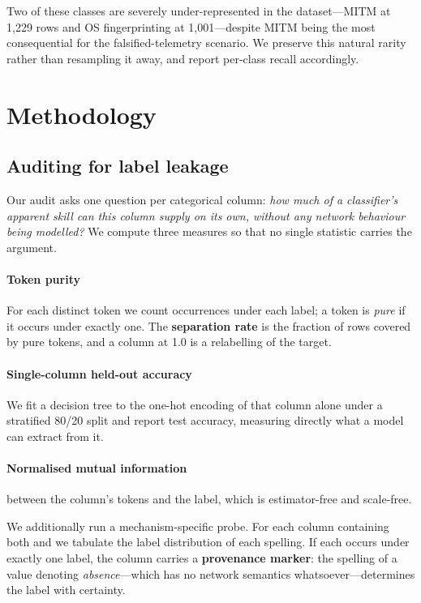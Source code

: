 Two of these classes are severely under-represented in the dataset---MITM at
1{,}229 rows and OS fingerprinting at 1{,}001---despite MITM being the most
consequential for the falsified-telemetry scenario. We preserve this natural
rarity rather than resampling it away, and report per-class recall accordingly.

\section{Methodology}

\subsection{Auditing for label leakage}
\label{sec:method-audit}

Our audit asks one question per categorical column: \emph{how much of a
classifier's apparent skill can this column supply on its own, without any
network behaviour being modelled?} We compute three measures so that no single
statistic carries the argument.

\paragraph{Token purity} For each distinct token we count occurrences under
each label; a token is \emph{pure} if it occurs under exactly one. The
\textbf{separation rate} is the fraction of rows covered by pure tokens, and a
column at 1.0 is a relabelling of the target.

\paragraph{Single-column held-out accuracy} We fit a decision tree to the
one-hot encoding of that column alone under a stratified 80/20 split and report
test accuracy, measuring directly what a model can extract from it.

\paragraph{Normalised mutual information} between the column's tokens and the
label, which is estimator-free and scale-free.

We additionally run a mechanism-specific probe. For each column containing both
 and  we tabulate the label distribution of each spelling. If
each occurs under exactly one label, the column carries a \textbf{provenance
marker}: the spelling of a value denoting \emph{absence}---which has no network
semantics whatsoever---determines the label with certainty.

